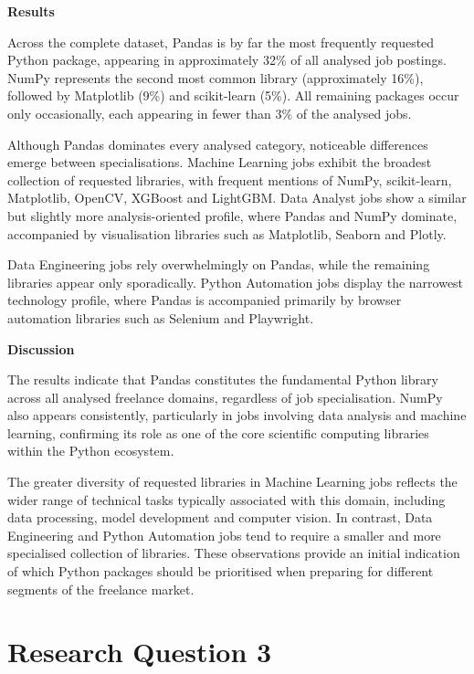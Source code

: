 \medskip

\textbf{Results}

Across the complete dataset, Pandas is by far the most frequently requested Python package, appearing in approximately 32\% of
all analysed job postings. NumPy represents the second most common library (approximately 16\%), followed by Matplotlib (9\%) and
scikit-learn (5\%). All remaining packages occur only occasionally, each appearing in fewer than 3\% of the analysed jobs.

Although Pandas dominates every analysed category, noticeable differences emerge between specialisations. Machine Learning jobs exhibit
the broadest collection of requested libraries, with frequent mentions of NumPy, scikit-learn, Matplotlib, OpenCV, XGBoost and LightGBM.
Data Analyst jobs show a similar but slightly more analysis-oriented profile, where Pandas and NumPy dominate, accompanied by
visualisation libraries such as Matplotlib, Seaborn and Plotly.

Data Engineering jobs rely overwhelmingly on Pandas, while the remaining libraries appear only sporadically. Python Automation jobs display
the narrowest technology profile, where Pandas is accompanied primarily by browser automation libraries such as Selenium and Playwright.

\medskip

\textbf{Discussion}

The results indicate that Pandas constitutes the fundamental Python library across all analysed freelance domains, regardless of job specialisation.
NumPy also appears consistently, particularly in jobs involving data analysis and machine learning, confirming its role as one of
the core scientific computing libraries within the Python ecosystem.

The greater diversity of requested libraries in Machine Learning jobs reflects the wider range of technical tasks typically associated with
this domain, including data processing, model development and computer vision. In contrast, Data Engineering and Python Automation jobs tend to
require a smaller and more specialised collection of libraries. These observations provide an initial indication of which Python packages should be
prioritised when preparing for different segments of the freelance market.

\section{Research Question 3}

